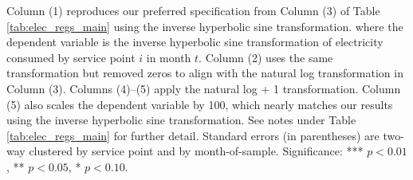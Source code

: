 \begin{table}[t!]
{Column (1) reproduces our preferred specification from Column (3) of Table \ref{tab:elec_regs_main} using the inverse hyperbolic sine transformation.
where the dependent variable is the inverse hyperbolic sine transformation of electricity consumed by service point $i$ in month $t$.
Column (2) uses the same transformation but removed zeros to align with the natural log transformation in Column (3). 
Columns (4)--(5) apply the natural log + 1 transformation. Column (5) also scales the dependent variable by 100, which nearly matches 
our results using the inverse hyperbolic sine transformation. 
See notes under Table \ref{tab:elec_regs_main} for further detail. 
Standard errors (in parentheses) are two-way clustered by service point and by month-of-sample.
Significance: *** $p < 0.01$, ** $p < 0.05$, * $p < 0.10$.
}
\end{table}

